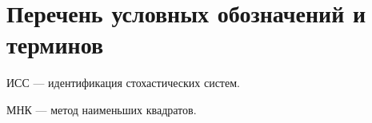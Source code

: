 \chapter*{Перечень условных обозначений и терминов}

ИСС --- идентификация стохастических систем.

МНК --- метод наименьших квадратов.


